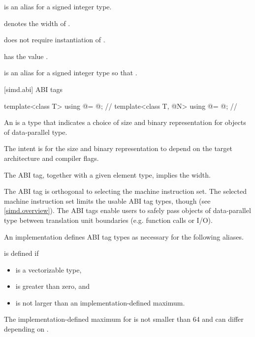 \pnum
\simdsizetype{} is an alias for a signed integer type.

\pnum
{} denotes the width of .
\begin{note}
   does not require instantiation of .
\end{note}

\pnum
{} has the value .

\pnum
{} is an alias for a signed integer type  so that .

[simd.abi]{ ABI tags}

\begin{codeblock}
template<class T> using @\nativeabi@ = @\seebelow@; // \expos
template<class T, @\simdsizetype@ N> using @\deducet@ = @\seebelow@; // \expos
\end{codeblock}

\pnum\label{wording.ABI.tag}
An  is a type that indicates a choice of size and binary
representation for objects of data-parallel type.
\begin{note}
  The intent is for the size and binary representation to depend on the target
  architecture and compiler flags.
\end{note}
The ABI tag, together with a given element type, implies the width.

\pnum
\begin{note}
The ABI tag is orthogonal to selecting the machine instruction set.
The selected machine instruction set limits the usable ABI tag types, though
(see \ref{simd.overview}).
The ABI tags enable users to safely pass objects of data-parallel type between
translation unit boundaries (e.g. function calls or I/O).
\end{note}

\pnum
An implementation defines ABI tag types as necessary for the following aliases.

\pnum\label{wording.deducet}
 is defined if
\begin{itemize}
  \item {} is a vectorizable type,
  \item {} is greater than zero, and
  \item {} is not larger than an implementation-defined maximum.
\end{itemize}
The implementation-defined maximum for  is not smaller than 64
and can differ depending on .

